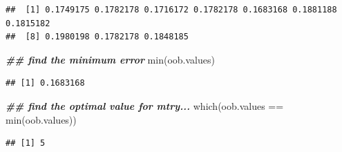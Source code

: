 \documentclass[
]{book}
\newenvironment{Shaded}{\begin{snugshade}}{\end{snugshade}}
\newcommand{\DocumentationTok}[1]{\textcolor[rgb]{0.56,0.35,0.01}{\textbf{\textit{#1}}}}
\newcommand{\FunctionTok}[1]{\textcolor[rgb]{0.00,0.00,0.00}{#1}}
\newcommand{\NormalTok}[1]{#1}
\newcommand{\SpecialCharTok}[1]{\textcolor[rgb]{0.00,0.00,0.00}{#1}}
\begin{document}
\begin{verbatim}
##  [1] 0.1749175 0.1782178 0.1716172 0.1782178 0.1683168 0.1881188 0.1815182
##  [8] 0.1980198 0.1782178 0.1848185
\end{verbatim}

\begin{Shaded}
\begin{Highlighting}[]
\DocumentationTok{\#\# find the minimum error}
\FunctionTok{min}\NormalTok{(oob.values)}
\end{Highlighting}
\end{Shaded}

\begin{verbatim}
## [1] 0.1683168
\end{verbatim}

\begin{Shaded}
\begin{Highlighting}[]
\DocumentationTok{\#\# find the optimal value for mtry...}
\FunctionTok{which}\NormalTok{(oob.values }\SpecialCharTok{==} \FunctionTok{min}\NormalTok{(oob.values))}
\end{Highlighting}
\end{Shaded}

\begin{verbatim}
## [1] 5
\end{verbatim}
\end{document}
